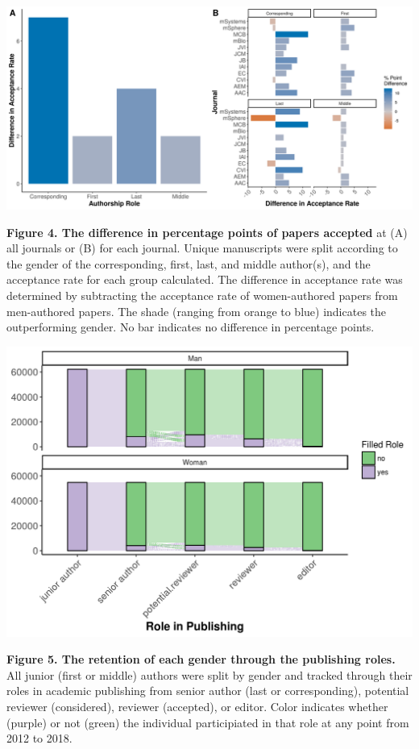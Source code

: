 \documentclass[11pt,]{article}
\begin{document}
\includegraphics{Figure_4.png}

\textbf{Figure 4. The difference in percentage points of papers
accepted} at (A) all journals or (B) for each journal. Unique
manuscripts were split according to the gender of the corresponding,
first, last, and middle author(s), and the acceptance rate for each
group calculated. The difference in acceptance rate was determined by
subtracting the acceptance rate of women-authored papers from
men-authored papers. The shade (ranging from orange to blue) indicates
the outperforming gender. No bar indicates no difference in percentage
points.

\includegraphics{Figure_5.png}

\textbf{Figure 5. The retention of each gender through the publishing
roles.} All junior (first or middle) authors were split by gender and
tracked through their roles in academic publishing from senior author
(last or corresponding), potential reviewer (considered), reviewer
(accepted), or editor. Color indicates whether (purple) or not (green)
the individual participiated in that role at any point from 2012 to
2018.
\end{document}
